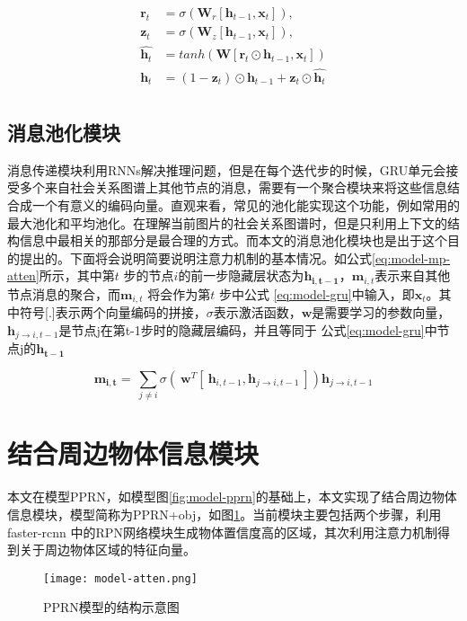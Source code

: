 \begin{equation} \label{eq:model-gru}
\begin{split}
\bm{r}_t &=  \sigma(\bm{W}_{r}[\bm{h}_{t-1}, \bm{x}_t]), \\
\bm{z}_t &=  \sigma(\bm{W}_{z}[\bm{h}_{t-1}, \bm{x}_t]), \\
\hat{\bm{h}_t} &= tanh(\bm{W}[\bm{r}_t \odot \bm{h}_{t-1}, \bm{x}_{t}])\\
\bm{h}_t &= (1 - \bm{z}_t) \odot \bm{h}_{t - 1} + \bm{z}_t \odot \hat{\bm{h}_t} \\
\end{split}
\end{equation}

\subsection{消息池化模块}

消息传递模块利用RNNs解决推理问题，但是在每个迭代步的时候，GRU单元会接受多个来自社会关系图谱上其他节点的消息，需要有一个聚合模块来将这些信息结合成一个有意义的编码向量。直观来看，常见的池化能实现这个功能，例如常用的最大池化和平均池化。在理解当前图片的社会关系图谱时，但是只利用上下文的结构信息中最相关的那部分是最合理的方式。而本文的消息池化模块也是出于这个目的提出的。下面将会说明简要说明注意力机制的基本情况。如公式\ref{eq:model-mp-atten}所示，其中第$t$ 步的节点$i$的前一步隐藏层状态为$\mathbf{h_{i,t-1}}$，$\mathbf{m}_{i,t}$表示来自其他节点消息的聚合，而$\bm{m}_{i,t}$ 将会作为第$t$ 步中公式
\ref{eq:model-gru}中输入，即$\mathbf{x}_{t}$。其中符号[.]表示两个向量编码的拼接，$\sigma$表示激活函数，$\bm{w}$是需要学习的参数向量，$\bm{h}_{j \to i,t-1}$是节点j在第t-1步时的隐藏层编码，并且等同于
公式\ref{eq:model-gru}中节点j的$\mathbf{h_{t-1}}$

\begin{equation}
    \label{eq:model-mp-atten}
	\bm{m_{i,t}} = ~\sum_{j\neq i} \sigma{(~\bm{w}^T[~\bm{h}_{i,t-1},\bm{h}_{j \to i,t-1}~]) \bm{h}_{j \to i,t-1}}	
\end{equation}


\section{结合周边物体信息模块}

本文在模型PPRN，如模型图\ref{fig:model-pprn}的基础上，本文实现了结合周边物体信息模块，模型简称为PPRN+obj，如图\ref{fig:model-atten}。当前模块主要包括两个步骤，利用faster-rcnn 中的RPN网络模块生成物体置信度高的区域，其次利用注意力机制得到关于周边物体区域的特征向量。
\begin{figure}[htpb]
	\centering
	\texttt{[image: model-atten.png]}
    \caption{PPRN模型的结构示意图}
	\vspace*{-3.5mm}
	\label{fig:model-atten}
\end{figure}


